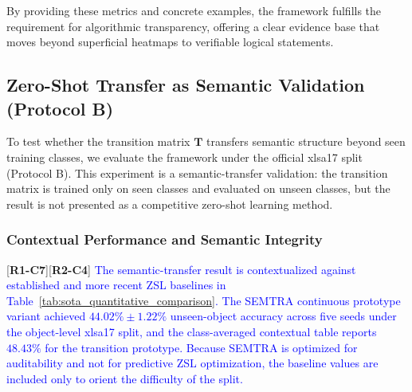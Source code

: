 \documentclass[make,article,submit,pdftex,moreauthors]{Definitions/mdpi}
\newcommand{\matT}{\mathbf{T}}
\newcommand{\revtag}[2]{[\textbf{R#1-C#2}]}
\newcommand{\Rone}[1]{\textcolor{red}{#1}}
\newcommand{\Rtwo}[1]{\textcolor{blue}{#1}}
\begin{document}
By providing these metrics and concrete examples, the framework fulfills the requirement for algorithmic transparency, offering a clear evidence base that moves beyond superficial heatmaps to verifiable logical statements.

\subsection{Zero-Shot Transfer as Semantic Validation (Protocol B)}
\label{subsec:protocol_b_results}

To test whether the transition matrix $\matT$ transfers semantic structure beyond seen training classes, we evaluate the framework under the official xlsa17 split (Protocol B). This experiment is a semantic-transfer validation: the transition matrix is trained only on seen classes and evaluated on unseen classes, but the result is not presented as a competitive zero-shot learning method.

\subsubsection{Contextual Performance and Semantic Integrity}
\label{subsubsec:semantic_integrity}

\revtag{1}{7}\revtag{2}{4} \Rone{\Rtwo{The semantic-transfer result is contextualized against established and more recent ZSL baselines in Table~\ref{tab:sota_quantitative_comparison}. The SEMTRA continuous prototype variant achieved $44.02\% \pm 1.22\%$ unseen-object accuracy across five seeds under the object-level xlsa17 split, and the class-averaged contextual table reports $48.43\%$ for the transition prototype. Because SEMTRA is optimized for auditability and not for predictive ZSL optimization, the baseline values are included only to orient the difficulty of the split.}}
\end{document}
